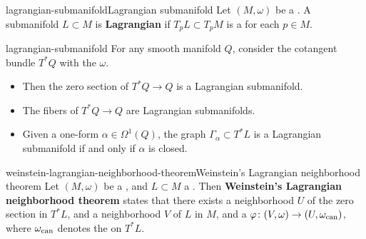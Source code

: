 \begin{topic}{lagrangian-submanifold}{Lagrangian submanifold}
    Let $(M, \omega)$ be a . A submanifold $L \subset M$ is \textbf{Lagrangian} if $T_p L \subset T_p M$ is a  for each $p \in M$.
\end{topic}

\begin{example}{lagrangian-submanifold}
    For any smooth manifold $Q$, consider the cotangent bundle $T^*Q$ with the  $\omega$.
    \begin{itemize}
        \item Then the zero section of $T^*Q \to Q$ is a Lagrangian submanifold.
        \item The fibers of $T^*Q \to Q$ are Lagrangian submanifolds.
        \item Given a one-form $\alpha \in \Omega^1(Q)$, the graph $\Gamma_\alpha \subset T^*L$ is a Lagrangian submanifold if and only if $\alpha$ is closed.
    \end{itemize}
\end{example}

\begin{topic}{weinstein-lagrangian-neighborhood-theorem}{Weinstein's Lagrangian neighborhood theorem}
    Let $(M, \omega)$ be a , and $L \subset M$ a  . Then \textbf{Weinstein's Lagrangian neighborhood theorem} states that there exists a neighborhood $U$ of the zero section in $T^*L$, and a neighborhood $V$ of $L$ in $M$, and a  $\varphi \colon (V, \omega) \to (U, \omega_\textup{can})$, where $\omega_\textup{can}$ denotes the  on $T^*L$.
\end{topic}


